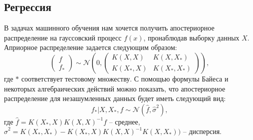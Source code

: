 \documentclass{llncs}
\begin{document}
\subsection{Регрессия}
В задачах машинного обучения нам хочется получить апостериорное распределение на гауссовский процесс $f\left(x\right)$, пронаблюдав выборку данных $X$. Априорное распределение задается следующим образом:
\begin{equation}
\begin{pmatrix}
f \\
f_{*}
\end{pmatrix} \sim \mathcal{N}
\left(
0, 
\begin{pmatrix}
K(X, X) & K(X, X_{*}) \\
K(X_{*}, X) & K(X_{*}, X_{*})
\end{pmatrix}\right),
\end{equation}
где $*$ соответствует тестовому множеству. С помощью формулы Байеса и некоторых алгебраических действий можно показать, что апостериорное распределение для незашумленных данных будет иметь следующий вид:
\begin{equation}\label{aposteriorinoiseless}
f_{*} | X, X_{*}, f \sim \mathcal{N} (\hat{f}, \hat{\sigma}^2),
\end{equation}
где $\hat{f} = K(X_{*}, X)K(X, X)^{-1}f$ -- среднее,\\ $\hat{\sigma}^2 = 
K(X_{*}, X_{*}) - K(X_{*},X)K(X, X)^{-1}K(X,X_{*}))$ -- дисперсия.

\end{document}
